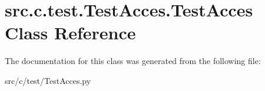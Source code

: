 \hypertarget{classsrc_1_1c_1_1test_1_1_test_acces_1_1_test_acces}{}\section{src.\+c.\+test.\+Test\+Acces.\+Test\+Acces Class Reference}
\label{classsrc_1_1c_1_1test_1_1_test_acces_1_1_test_acces}


The documentation for this class was generated from the following file\+:\begin{DoxyCompactItemize}
\item 
src/c/test/Test\+Acces.\+py\end{DoxyCompactItemize}
